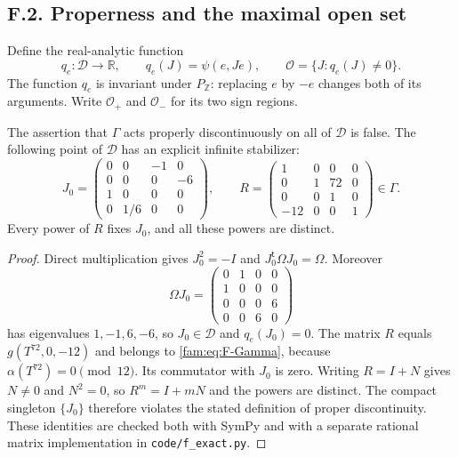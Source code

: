 \subsection{F.2. Properness and the maximal open set}

Define the real-analytic function
\[
 q_e:\mathcal D\longrightarrow\mathbb R,\qquad q_e(J)=\psi(e,Je),
 \qquad\mathcal O=\{J:q_e(J)\ne0\}.
\]
The function $q_e$ is invariant under $P_{\mathbb Z}$: replacing $e$ by
$-e$ changes both of its arguments.  Write $\mathcal O_+$ and
$\mathcal O_-$ for its two sign regions.

\begin{proposition}[counterexample]\label{fam:src:F.2.1}\label{fam:st:F.2.1}
The assertion that $\Gamma$ acts properly discontinuously on all of
$\mathcal D$ is false.  The following point of $\mathcal D$ has an
explicit infinite stabilizer:
\[
 J_0=\begin{pmatrix}
 0&0&-1&0\\0&0&0&-6\\1&0&0&0\\0&1/6&0&0
 \end{pmatrix},\qquad
 R=\begin{pmatrix}
 1&0&0&0\\0&1&72&0\\0&0&1&0\\-12&0&0&1
 \end{pmatrix}\in\Gamma.
\]
Every power of $R$ fixes $J_0$, and all these powers are distinct.
\end{proposition}

\begin{proof}
Direct multiplication gives $J_0^2=-I$ and
$J_0^{\mathsf t}\Omega J_0=\Omega$.  Moreover
\[
 \Omega J_0=\begin{pmatrix}
 0&1&0&0\\1&0&0&0\\0&0&0&6\\0&0&6&0
 \end{pmatrix}
\]
has eigenvalues $1,-1,6,-6$, so $J_0\in\mathcal D$ and $q_e(J_0)=0$.
The matrix $R$ equals $g(T^{72},0,-12)$ and belongs to \eqref{fam:eq:F-Gamma},
because $\alpha(T^{72})=0\pmod{12}$.  Its commutator with $J_0$ is zero.
Writing $R=I+N$ gives $N\ne0$ and $N^2=0$, so $R^m=I+mN$ and the
powers are distinct.  The compact singleton $\{J_0\}$ therefore violates
the stated definition of proper discontinuity.  These identities are
checked both with SymPy and with a separate rational matrix
implementation in \texttt{code/f\_exact.py}.
\end{proof}

